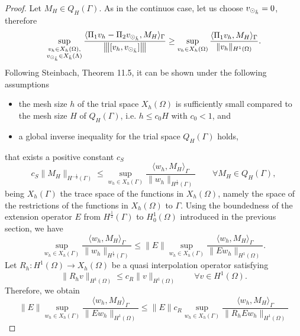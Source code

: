 \begin{proof}
Let $M_H \in Q_H(\Gamma)$. As in the continuos case, let us choose $v_{\odot_{\tilde{h}}} =0$, therefore 
\begin{equation*}
\sup_{\substack{v_h \in X_h(\Omega),\\ v_{\odot_{\tilde{h}}} \in X_{\tilde{h}}(\Lambda)}} \frac{ \langle \Pi_1 v_h - \Pi_2 v_{\odot_{\tilde{h}}}, M_H \rangle _{\Gamma}} {{\left\vert\kern-0.25ex\left\vert\kern-0.25ex\left\vert [v_h, v_{\odot_{\tilde{h}}}] \right\vert\kern-0.25ex\right\vert\kern-0.25ex\right\vert}}
\geq \sup_{v_h \in X_h(\Omega)} \frac{ \langle \Pi_1 v_h, M_H \rangle _{\Gamma} } {\|v_h\|_{H^1(\Omega)}}.
\end{equation*}
Following Steinbach, Theorem 11.5, it can be shown under the following assumptions 
\begin{itemize}
\item the mesh size $h$ of the trial space $X_h(\Omega)$ is sufficiently small compared to the mesh size $H$ of $Q_H(\Gamma)$, i.e. $h \leq c_0 H$ with $c_0 < 1$, and
\item a global inverse inequality for the trial space $Q_H(\Gamma)$ holds,
\end{itemize}
that exists a positive constant $c_S$
\begin{equation}\label{infsup_tracespace}
c_S \|M_H\|_{H^{-\frac 12}(\Gamma)} \leq 
\sup_{w_h \in X_h(\Gamma)} \frac{ \langle w_h, M_H \rangle _{\Gamma} } {\|w_h\|_{H^{\frac 12}(\Gamma)}} \qquad \forall M_H \in Q_H(\Gamma),
\end{equation}
being $X_h(\Gamma)$ the trace space of the functions in $X_h(\Omega)$, namely the space of the restrictions of the functions in $X_h(\Omega)$ to $\Gamma$. 
Using the boundedness of the extension operator $E$ from $H^{\frac 12}(\Gamma)$ to $H^1_0(\Omega)$ introduced in the previous section, we have
\begin{equation*}
\sup_{w_h \in X_h(\Gamma)} \frac{ \langle w_h, M_H \rangle _{\Gamma} } {\|w_h\|_{H^{\frac 12}(\Gamma)}} 
\leq 
\|E\| \sup_{w_h \in X_h(\Gamma)} \frac{ \langle w_h, M_H \rangle _{\Gamma} } {\|E w_h\|_{H^1(\Omega)}}.
\end{equation*}
Let $R_h: H^1(\Omega) \rightarrow X_h(\Omega)$ be a quasi interpolation operator satisfying 
\begin{equation*}
\|R_h v\|_{H^1(\Omega)} \leq c_R \|v\|_{H^1(\Omega)} \qquad \forall v \in H^1(\Omega).
\end{equation*}
Therefore, we obtain 
\begin{equation*}
\|E\| \sup_{w_h \in X_h(\Gamma)} \frac{ \langle w_h, M_H \rangle _{\Gamma} } {\|E w_h\|_{H^1(\Omega)}}
\leq
\|E\| c_R \sup_{w_h \in X_h(\Gamma)} \frac{ \langle w_h, M_H \rangle_{\Gamma} } {\|R_hE w_h\|_{H^1(\Omega)}}

\end{equation*}
\end{proof}

